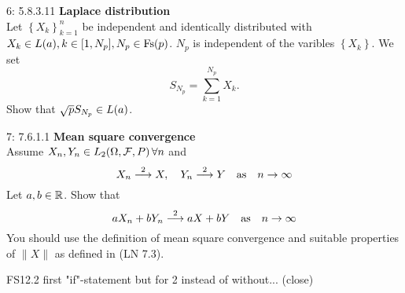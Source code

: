 \documentclass[a4paper,twoside=false,abstract=false,numbers=noenddot,
titlepage=false,headings=small,parskip=half,version=last]{scrartcl}
\begin{document}

\begin{exercise}{6: 5.8.3.11} \textbf{Laplace distribution} \\
    Let $\left\{{X_k}\right\}_{k=1}^n$ be independent and identically
    distributed with
    ${X_k \in\text{$L$}(a),}\, {k\in[1,N_p],}\, {N_p\in \text{Fs}(p)}$.
    $N_p$ is independent of the varibles $\left\{X_k\right\}$. We set
    \begin{equation}
        S_{N_p} = \sum\limits_{k=1}^{N_p}X_k.
    \end{equation}
    Show that $\sqrt{p}S_{N_p}\in\text{$L$}(a)$.
\end{exercise}
\begin{solution}
\end{solution}
\pagebreak


\begin{exercise}{7: 7.6.1.1} \textbf{Mean square convergence}\\
    Assume $X_n, Y_n\in \text{$L_2$}(\Omega,\mathcal{F},P)\, \forall n$ and
    \begin{equation}
        X_n \stackrel{2}{\longrightarrow} X, \quad
        Y_n \stackrel{2}{\longrightarrow} Y \quad
        \text{as}\quad n\rightarrow\infty
    \end{equation}
    Let $a, b \in \mathbb{R}$. Show that
    \begin{equation}
        aX_n + bY_n\stackrel{2}{\longrightarrow} aX + bY\quad
        \text{as}\quad n\rightarrow\infty
    \end{equation}
    You should use the definition of mean square convergence and suitable
    properties of $\|X\|$ as defined in (LN 7.3).
\end{exercise}
\begin{solution}
    FS12.2 first "if"-statement but for 2 instead of without... (close)
\end{solution}
\pagebreak

\end{document}

